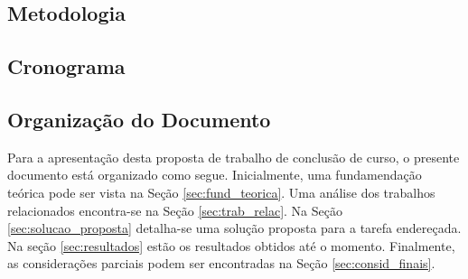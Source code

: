 \subsection{Metodologia}\label{sec:metodo}


\subsection{Cronograma}\label{sec:crono}


\subsection{Organização do Documento}
Para a apresentação desta proposta de trabalho de conclusão de curso, o presente documento está organizado como segue. Inicialmente, uma fundamendação teórica pode ser vista na Seção \ref{sec:fund_teorica}. Uma análise dos trabalhos relacionados encontra-se na Seção \ref{sec:trab_relac}. Na Seção \ref{sec:solucao_proposta} detalha-se uma solução proposta para a tarefa endereçada. Na seção \ref{sec:resultados} estão os resultados obtidos até o momento. Finalmente, as considerações parciais podem ser encontradas na Seção \ref{sec:consid_finais}.
